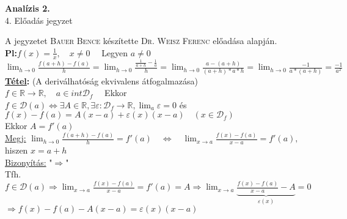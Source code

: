 \documentclass[a4paper,11pt]{article}
\begin{document}
\def\Z{\mathbb{Z}}
\def\Q{\mathbb{Q}}
\def\R{\mathbb{R}}
\def\N{\mathbb{N}}
\def\Rn{\mathbb{R}^{n}}
\def\Ra{\overline{\mathbb{R}}}
\def\narrow{\underset{n\rightarrow+\infty}{\longrightarrow}}
\def\sume{\displaystyle\sum_{n=1}^{+\infty}}
\def\sumn{\displaystyle\sum_{n=0}^{+\infty}}
\def\biz{\normalsize{\underline{Bizonyítás:} }\hspace*{0.5cm}}
\def\tetel{\normalsize \textbf{\underline{Tétel}: }}
\def\defi{\normalsize \textbf{Definíció: }}
\def\limn{\displaystyle\lim_{n\to +\infty}}
\def\limh{\displaystyle\lim_{h\to0}}
\def\limxa{\displaystyle\lim_{x\to a}}
\def\limxatelj{\displaystyle\lim_{x\to a}\frac{f(x)-f(a)}{x-a}}
\def\pl{\textbf{Pl:}}
\def\rtr{\displaystyle\R\to\R}
\def\D{\displaystyle\mathcal{D}}
\def\lima{\displaystyle\lim_{a}}
\def\bizva{\quad\blacksquare}
\def\fda{f\in\D(a)}
\begin{center}
	{\LARGE\textbf{Analízis 2.}}\\[0.2cm]
	
	{\Large 4. Előadás jegyzet}\\[1cm]	
\end{center}
{\small A jegyzetet \textsc{Bauer Bence} készítette \textsc{Dr. Weisz Ferenc} előadása alapján.}\\[0.2cm]
\pl $f(x)=\frac{1}{x},\quad x\neq 0\quad$ Legyen $a\neq 0$\\[0.1cm]$\limh\frac{f(a+h)-f(a)}{h}=\limh\frac{\frac{1}{a+h}-\frac{1}{a}}{h}= \limh\frac{a-(a+h)}{(a+h)*a*h}=\limh\frac{-1}{a*(a+h)}=\frac{-1}{a^2}$\\[0.2cm]
\tetel (A deriválhatóság ekvivalens átfogalmazása)\\[0.1cm] $f\in\rtr,\quad a\in int\D_f\quad$ Ekkor\\[0.1cm]$\fda\Leftrightarrow\exists A\in\R, \exists\varepsilon:\D_f\to\R,\lima\varepsilon=0$ és $f(x)-f(a)=A(x-a)+\varepsilon(x)(x-a) \quad(x\in\D_f)$\\[0.1cm]Ekkor $A=f'(a)$\\[0.1cm]\hspace*{1cm}\underline{Megj:} $\limh\frac{f(a+h)-f(a)}{h}=f'(a)\quad\Leftrightarrow\quad\limxa\frac{f(x)-f(a)}{x-a}=f'(a),\quad$hiszen $x=a+h$\\[0.3cm]\biz"$\Rightarrow$"\\[0.1cm]Tfh. $f\in\D(a) \Rightarrow\limxatelj=f'(a)=A\Rightarrow\limxa\underbrace{\frac{f(x)-f(a)}{x-a}-A}_{\varepsilon(x)}=0$\\[0.2cm]$\Rightarrow f(x)-f(a)-A(x-a)=\varepsilon(x)(x-a)$\\[0.2cm]
\end{document}
